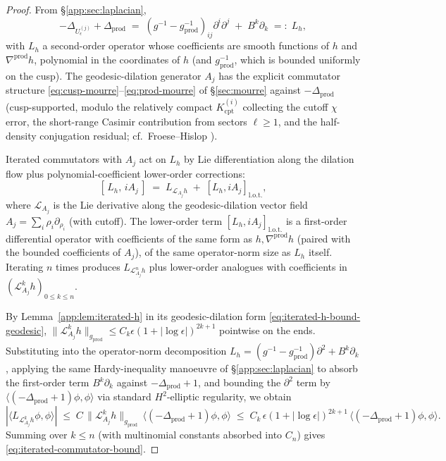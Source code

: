 \documentclass[11pt,letterpaper]{article}
\theoremstyle{definition}
\newcommand{\Lap}{\Delta}
\begin{document}
\begin{proof}
From \S\ref{app:sec:laplacian},
\[
-\Lap_{U_\epsilon^{(j)}} + \Lap_{\mathrm{prod}} \;=\; (g^{-1} - g_{\mathrm{prod}}^{-1})_{ij}\partial^i\partial^j \;+\; B^k\partial_k \;=:\; L_h,
\]
with $L_h$ a second-order operator whose coefficients are smooth functions of $h$ and $\nabla^{\mathrm{prod}}h$, polynomial in the coordinates of $h$ (and $g_{\mathrm{prod}}^{-1}$, which is bounded uniformly on the cusp). The geodesic-dilation generator $A_j$ has the explicit commutator structure \eqref{eq:cusp-mourre}--\eqref{eq:prod-mourre} of \S\ref{sec:mourre} against $-\Lap_{\mathrm{prod}}$ (cusp-supported, modulo the relatively compact $K_{\mathrm{cpt}}^{(i)}$ collecting the cutoff $\chi$ error, the short-range Casimir contribution from sectors $\ell\ge 1$, and the half-density conjugation residual; cf.\ Froese--Hislop \cite{FroeseHislop1989}).

Iterated commutators with $A_j$ act on $L_h$ by Lie differentiation along the dilation flow plus polynomial-coefficient lower-order corrections:
\[
[\,L_h,\,iA_j\,] \;=\; L_{\mathcal{L}_{A_j} h}\;+\;[L_h, iA_j]_{\mathrm{l.o.t.}},
\]
where $\mathcal{L}_{A_j}$ is the Lie derivative along the geodesic-dilation vector field $A_j = \sum_i \rho_i\partial_{\rho_i}$ (with cutoff). The lower-order term $[L_h, iA_j]_{\mathrm{l.o.t.}}$ is a first-order differential operator with coefficients of the same form as $h, \nabla^{\mathrm{prod}}h$ (paired with the bounded coefficients of $A_j$), of the same operator-norm size as $L_h$ itself. Iterating $n$ times produces $L_{\mathcal{L}_{A_j}^n h}$ plus lower-order analogues with coefficients in $(\mathcal{L}_{A_j}^k h)_{0\le k\le n}$.

By Lemma~\ref{app:lem:iterated-h} in its geodesic-dilation form \eqref{eq:iterated-h-bound-geodesic}, $\|\mathcal{L}_{A_j}^k h\|_{g_{\mathrm{prod}}}\le C_k\epsilon(1+|\log\epsilon|)^{2k+1}$ pointwise on the ends. Substituting into the operator-norm decomposition $L_h = (g^{-1} - g_{\mathrm{prod}}^{-1})\partial^2 + B^k\partial_k$, applying the same Hardy-inequality manoeuvre of \S\ref{app:sec:laplacian} to absorb the first-order term $B^k\partial_k$ against $-\Lap_{\mathrm{prod}}+1$, and bounding the $\partial^2$ term by $\langle(-\Lap_{\mathrm{prod}}+1)\phi,\phi\rangle$ via standard $H^2$-elliptic regularity, we obtain
\[
|\langle L_{\mathcal{L}_{A_j}^k h}\phi,\phi\rangle| \;\le\; C\,\|\mathcal{L}_{A_j}^k h\|_{g_{\mathrm{prod}}}\,\langle(-\Lap_{\mathrm{prod}}+1)\phi,\phi\rangle \;\le\; C_k\,\epsilon(1+|\log\epsilon|)^{2k+1}\,\langle(-\Lap_{\mathrm{prod}}+1)\phi,\phi\rangle.
\]
Summing over $k\le n$ (with multinomial constants absorbed into $C_n$) gives \eqref{eq:iterated-commutator-bound}.


\end{proof}
\end{document}
